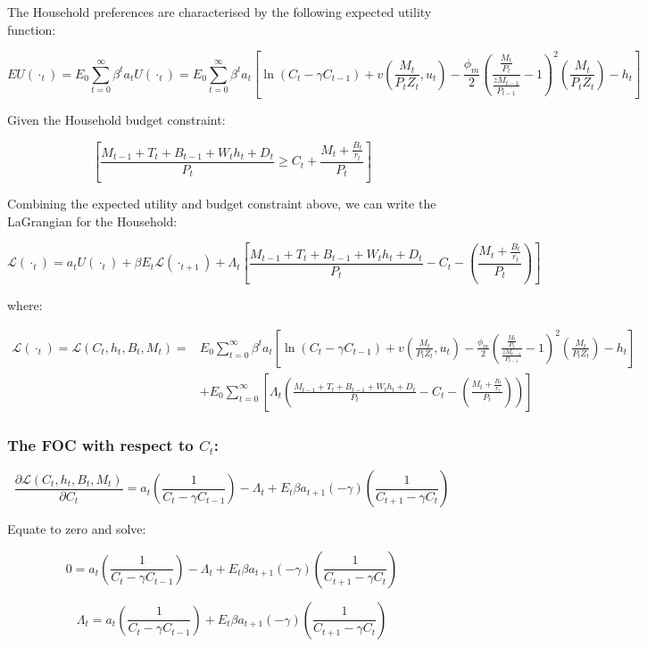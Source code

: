 \documentclass[11pt,preprint, authoryear]{elsarticle}
\numberwithin{equation}{section}
\numberwithin{figure}{section}
\numberwithin{table}{section}
\begin{document}
The Household preferences are characterised by the following expected
utility function:

\[ EU(\cdot_t) = E_{0} \sum_{t=0}^\infty \beta^ta_t U(\cdot_t) = E_{0} \sum_{t=0}^\infty \beta^ta_t[\ln(C_{t}-\gamma C_{t-1})+v(\frac{M_t}{P_tZ_t},u_t)-\frac{\phi_m}{2}(\frac{\frac{M_t}{P_t}}{\frac{zM_{t-1}}{P_{t-1}}}-1)^2(\frac{M_t}{P_tZ_t})-h_t]\]

Given the Household budget constraint:

\[ \left[ \frac{M_{t-1} + T_t +B_{t-1} + W_th_t+D_t}{P_t} \ge C_t + \frac{M_t+\frac{B_t}{r_t}}{P_t} \right]\]

Combining the expected utility and budget constraint above, we can write
the LaGrangian for the Household:

\[  \mathcal{L}(\cdot_t) = a_tU( \cdot_{t}) + \beta E_t \mathcal{L}(\cdot_{t+1}) + \Lambda_t \left[ \frac{M_{t-1} + T_t +B_{t-1} + W_th_t+D_t}{P_t}-C_t - \left(\frac{M_t+\frac{B_t}{r_t}}{P_t} \right) \right] \]

where:

\[\begin{aligned} \mathcal{L}(\cdot_{t}) = \mathcal{L}(C_t, h_t, B_t, M_t) = &E_{0} \sum_{t=0}^\infty \beta^ta_t \left[\ln(C_{t}-\gamma C_{t-1})+v(\frac{M_t}{P_tZ_t},u_t)-\frac{\phi_m}{2}(\frac{\frac{M_t}{P_t}}{\frac{zM_{t-1}}{P_{t-1}}}-1)^2(\frac{M_t}{P_tZ_t})-h_t \right]\\
& + E_{0} \sum_{t=0}^\infty\left[ \Lambda_t \left( \frac{M_{t-1} + T_t +B_{t-1} + W_th_t+D_t}{P_t}-C_t - \left(\frac{M_t+\frac{B_t}{r_t}}{P_t} \right) \right) \right] \end{aligned}\]

\hypertarget{the-foc-with-respect-to-c_t}{%
\subsubsection{\texorpdfstring{The FOC with respect to
\(C_t\):}{The FOC with respect to C\_t:}}\label{the-foc-with-respect-to-c_t}}

\[\frac{\partial \mathcal{L}(C_t, h_t, B_t, M_t)}{\partial C_t}= a_t(\frac{1}{C_t-\gamma C_{t-1}})-\Lambda_t + E_t\beta a_{t+1}(-\gamma)(\frac{1}{C_{t+1}-\gamma C_t})\]

Equate to zero and solve:

\[0=  a_t(\frac{1}{C_t-\gamma C_{t-1}})-\Lambda_t + E_t\beta a_{t+1}(-\gamma)(\frac{1}{C_{t+1}-\gamma C_t})\]

\[\Lambda_t =  a_t(\frac{1}{C_t-\gamma C_{t-1}}) + E_t\beta a_{t+1}(-\gamma)(\frac{1}{C_{t+1}-\gamma C_t}) \tag{5}\]
\end{document}
